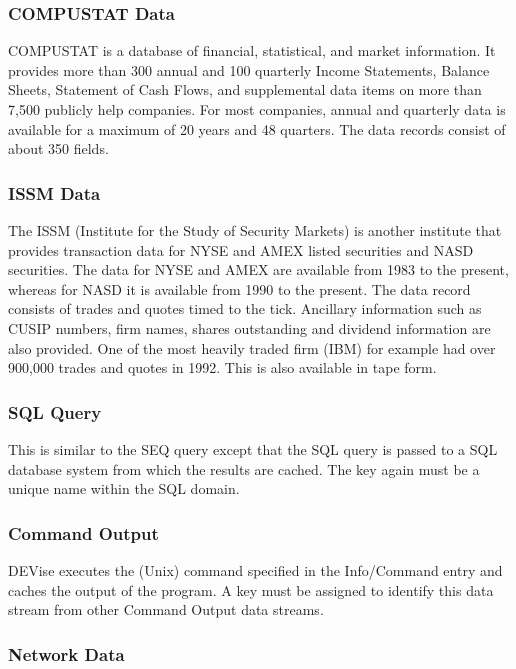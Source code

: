 \subsubsection{COMPUSTAT Data}

COMPUSTAT is a database of financial, statistical, and market
information. It provides more than 300 annual and 100 quarterly Income
Statements, Balance Sheets, Statement of Cash Flows, and supplemental
data items on more than 7,500 publicly help companies. For most
companies, annual and quarterly data is available for a maximum of 20
years and 48 quarters. The data records consist of about 350 fields.

\subsubsection{ISSM Data}

The ISSM (Institute for the Study of Security Markets) is another
institute that provides transaction data for NYSE and AMEX listed
securities and NASD securities. The data for NYSE and AMEX are
available from 1983 to the present, whereas for NASD it is available
from 1990 to the present. The data record consists of trades and
quotes timed to the tick. Ancillary information such as CUSIP numbers,
firm names, shares outstanding and dividend information are also
provided. One of the most heavily traded firm (IBM) for example had
over 900,000 trades and quotes in 1992. This is also available in tape
form.

\subsubsection{SQL Query}

This is similar to the SEQ query except that the SQL query is passed
to a SQL database system from which the results are cached. The key
again must be a unique name within the SQL domain.

\subsubsection{Command Output}

DEVise executes the (Unix) command specified in the Info/Command
entry and caches the output of the program. A key must be assigned to
identify this data stream from other Command Output data streams.

\subsubsection{Network Data}

